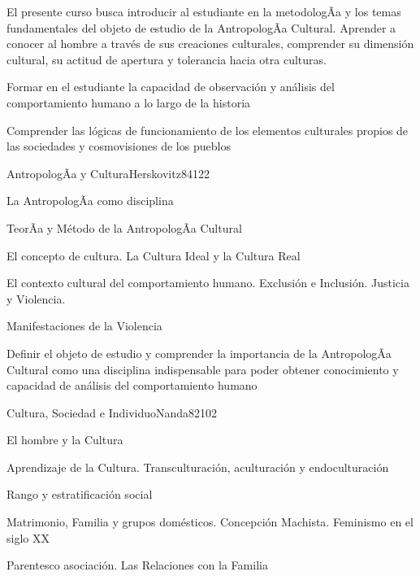 \begin{syllabus}


\begin{justification}    
El presente curso busca introducir al estudiante en la metodologÃ­a y los temas fundamentales del 
objeto de estudio de la AntropologÃ­a Cultural. Aprender a conocer al hombre a través de sus 
creaciones culturales, comprender su dimensión cultural, su actitud de apertura y 
tolerancia hacia otra culturas.
\end{justification}

\begin{goals}
\item Formar en el estudiante la capacidad de observación y análisis del comportamiento humano a lo largo de la historia  
\item Comprender las lógicas de funcionamiento de los elementos culturales propios de las sociedades y cosmovisiones de los pueblos
\end{goals}

\begin{outcomes}
\end{outcomes}

\begin{unit}{AntropologÃ­a y Cultura}{Herskovitz84}{12}{2}
   \begin{topics}
      \item La AntropologÃ­a como disciplina
	\item TeorÃ­a y Método de la AntropologÃ­a Cultural
	\item El concepto de cultura. La Cultura Ideal y la Cultura Real
	\item El contexto cultural del comportamiento humano. Exclusión e Inclusión. Justicia y Violencia.
	\item Manifestaciones de la Violencia
   \end{topics}

   \begin{unitgoals}
      \item Definir el objeto de estudio y comprender la importancia de la AntropologÃ­a Cultural como una disciplina indispensable para poder obtener conocimiento y capacidad de análisis del comportamiento humano
   \end{unitgoals}
\end{unit}

\begin{unit}{Cultura, Sociedad e Individuo}{Nanda82}{10}{2}
   \begin{topics}
      \item El hombre y la Cultura
	\item Aprendizaje de la Cultura. Transculturación, aculturación y endoculturación
	\item Rango y estratificación social
	\item Matrimonio, Familia y grupos domésticos. Concepción Machista. Feminismo en el siglo XX
	\item Parentesco asociación. Las Relaciones con la Familia
   \end{topics}


\end{unit}
\end{syllabus}
